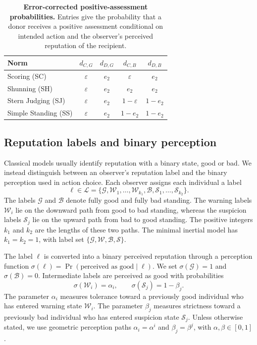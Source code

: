\documentclass[fleqn,10pt]{wlscirep}
\begin{document}
\begin{table}[t]
\centering
\caption{\textbf{Error-corrected positive-assessment probabilities.} Entries give the probability that a donor receives a positive assessment conditional on intended action and the observer's perceived reputation of the recipient.}
\label{tab:error-corrected-assessment}
\begin{tabular}{lcccc}
\hline
Norm & $d_{C,G}$ & $d_{D,G}$ & $d_{C,B}$ & $d_{D,B}$ \\
\hline
Scoring (SC) & $\varepsilon$ & $e_2$ & $\varepsilon$ & $e_2$ \\
Shunning (SH) & $\varepsilon$ & $e_2$ & $e_2$ & $e_2$ \\
Stern Judging (SJ) & $\varepsilon$ & $e_2$ & $1-\varepsilon$ & $1-e_2$ \\
Simple Standing (SS) & $\varepsilon$ & $e_2$ & $1-e_2$ & $1-e_2$ \\
\hline
\end{tabular}
\end{table}

\subsection*{Reputation labels and binary perception}

Classical models usually identify reputation with a binary state, good or bad. We instead distinguish between an observer's reputation label and the binary perception used in action choice. Each observer assigns each individual a label
\[
\ell\in\mathcal{L}=\{\mathcal{G},\mathcal{W}_1,\ldots,\mathcal{W}_{k_1},\mathcal{B},\mathcal{S}_1,\ldots,\mathcal{S}_{k_2}\}.
\]
The labels $\mathcal{G}$ and $\mathcal{B}$ denote fully good and fully bad standing. The warning labels $\mathcal{W}_i$ lie on the downward path from good to bad standing, whereas the suspicion labels $\mathcal{S}_j$ lie on the upward path from bad to good standing. The positive integers $k_1$ and $k_2$ are the lengths of these two paths. The minimal inertial model has $k_1=k_2=1$, with label set $\{\mathcal{G},\mathcal{W},\mathcal{B},\mathcal{S}\}$.

The label $\ell$ is converted into a binary perceived reputation through a perception function $\sigma(\ell)=\Pr(\text{perceived as good}\mid \ell)$. We set $\sigma(\mathcal{G})=1$ and $\sigma(\mathcal{B})=0$. Intermediate labels are perceived as good with probabilities
\[
\sigma(\mathcal{W}_i)=\alpha_i,\qquad
\sigma(\mathcal{S}_j)=1-\beta_j .
\]
The parameter $\alpha_i$ measures tolerance toward a previously good individual who has entered warning state $\mathcal{W}_i$. The parameter $\beta_j$ measures strictness toward a previously bad individual who has entered suspicion state $\mathcal{S}_j$. Unless otherwise stated, we use geometric perception paths $\alpha_i=\alpha^i$ and $\beta_j=\beta^j$, with $\alpha,\beta\in[0,1]$.
\end{document}
